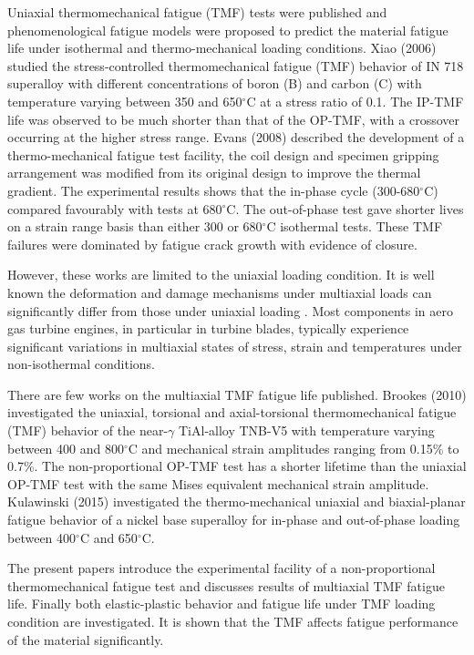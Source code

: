 Uniaxial thermomechanical fatigue (TMF) tests \cite{remy2003thermal} were published and phenomenological fatigue models \cite{vose2013approach} were proposed to predict the material fatigue life under isothermal and thermo-mechanical loading conditions.
Xiao (2006) \cite{Xiao2006157} studied the stress-controlled thermomechanical fatigue (TMF) behavior of IN 718 superalloy with different concentrations of boron (B) and carbon (C) with temperature varying between 350 and 650$^{\circ}$C at a stress ratio of 0.1. The IP-TMF life was observed to be much shorter than that of the OP-TMF, with a crossover occurring at the higher stress range.
Evans (2008) \cite{evans2008thermo} described the development of a thermo-mechanical fatigue test facility, the coil design and specimen gripping arrangement was modified from its original design to improve the thermal gradient.
The experimental results shows that the in-phase cycle (300-680$^{\circ}$C) compared favourably with tests at 680$^{\circ}$C.
The out-of-phase test gave shorter lives on a strain range basis than either 300 or 680$^{\circ}$C isothermal tests.
These TMF failures were dominated by fatigue crack growth with evidence of closure.

However, these works are limited to the uniaxial loading condition.
It is well known the deformation and damage mechanisms under multiaxial loads can significantly differ from those under uniaxial loading \cite{fang2015cyclic}\cite{kang2004uniaxial}\cite{chen2004modified}.
Most components in aero gas turbine engines, in particular in turbine blades, typically experience significant variations in multiaxial states of stress, strain and temperatures under non-isothermal conditions.

There are few works on the multiaxial TMF fatigue life published.
Brookes (2010) \cite{brookes2010axial} investigated the uniaxial, torsional and axial-torsional thermomechanical fatigue (TMF) behavior of the near-$\gamma$ TiAl-alloy TNB-V5 with temperature varying between 400 and 800$^{\circ}$C and mechanical strain amplitudes ranging from 0.15\% to 0.7\%. The non-proportional OP-TMF test has a shorter lifetime than the uniaxial OP-TMF test with the same Mises equivalent mechanical strain amplitude.
Kulawinski (2015) \cite{Kulawinski201521} investigated the thermo-mechanical uniaxial and biaxial-planar fatigue behavior of a nickel base superalloy for in-phase and out-of-phase loading between 400$^{\circ}$C and 650$^{\circ}$C.

The present papers introduce the experimental facility of a non-proportional thermomechanical fatigue test and discusses results of multiaxial TMF fatigue life.
Finally both elastic-plastic behavior and fatigue life under TMF loading condition are investigated.
It is shown that the TMF affects fatigue performance of the material significantly.

